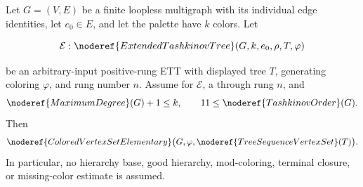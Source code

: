 \begin{theorem}
Let \(G=(V,E)\) be a finite loopless multigraph with its individual edge
identities, let \(e_0\in E\), and let the palette have \(k\) colors.  Let

\[
 \mathcal E:\noderef{ExtendedTashkinovTree}(G,k,e_0,\rho,T,\varphi)
\]

be an arbitrary-input positive-rung ETT with displayed tree \(T\), generating
coloring \(\varphi\), and rung number \(n\).  Assume
 for \(\mathcal E\), a
 through rung \(n\), and
\[
 \noderef{MaximumDegree}(G)+1\leq k,
 \qquad 11\leq \noderef{TashkinovOrder}(G).
\]
Then
\[
 \noderef{ColoredVertexSetElementary}
   \bigl(G,\varphi,\noderef{TreeSequenceVertexSet}(T)\bigr).
\]
In particular, no hierarchy base, good hierarchy, mod-coloring, terminal
closure, or missing-color estimate is assumed.
\end{theorem}
